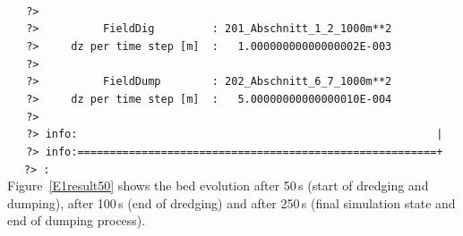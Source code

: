 \\~\hspace*{3mm}~\texttt{\small{~?>~~~~~~~~~~~~~~~~~~~~~~~~~~~~~~~~~~~~~~~~~~~~~~~~~~~~~~~~~~~~~~~}}
\\~\hspace*{3mm}~\texttt{\small{~?>~~~~~~~~~~FieldDig~~~~~~~~~:~201\_Abschnitt\_1\_2\_1000m**2~~~~~~~~}}
\\~\hspace*{3mm}~\texttt{\small{~?>~~~~~dz~per~time~step~[m]~~:~~~1.00000000000000002E-003~~~~~~~~}}
\\~\hspace*{3mm}~\texttt{\small{~?>~~~~~~~~~~~~~~~~~~~~~~~~~~~~~~~~~~~~~~~~~~~~~~~~~~~~~~~~~~~~~~~}}
\\~\hspace*{3mm}~\texttt{\small{~?>~~~~~~~~~~FieldDump~~~~~~~~:~202\_Abschnitt\_6\_7\_1000m**2~~~~~~~~}}
\\~\hspace*{3mm}~\texttt{\small{~?>~~~~~dz~per~time~step~[m]~~:~~~5.00000000000000010E-004~~~~~~~~}}
\\~\hspace*{3mm}~\texttt{\small{~?>~~~~~~~~~~~~~~~~~~~~~~~~~~~~~~~~~~~~~~~~~~~~~~~~~~~~~~~~~~~~~~~}}
\\~\hspace*{3mm}~\texttt{\small{~?>~info:~~~~~~~~~~~~~~~~~~~~~~~~~~~~~~~~~~~~~~~~~~~~~~~~~~~~~~~~|}}
\\~\hspace*{3mm}~\texttt{\small{~?>~info:========================================================+}}
\\~\hspace*{3mm} \texttt{\small{~?>~:}}
\\
\newpage
Figure~\ref{E1result50} shows the bed evolution after 50\,s (start of dredging and dumping),
after 100\,s (end of dredging) and after 250\,s (final simulation state and end of dumping process).

